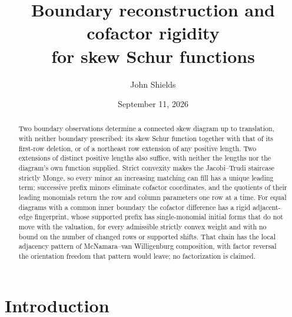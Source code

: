 \documentclass[11pt,a4paper]{amsart}
\title[Boundary reconstruction and cofactor rigidity]
{Boundary reconstruction and cofactor rigidity\\
for skew Schur functions}
\author{John Shields}
\date{September 11, 2026}
\numberwithin{equation}{section}
\theoremstyle{plain}
\theoremstyle{definition}
\begin{document}
\begin{abstract}
Two boundary observations determine a connected skew diagram up to translation, with neither boundary prescribed: its skew Schur function together with that of its first-row deletion, or of a northeast row extension of any positive length.  Two extensions of distinct positive lengths also suffice, with neither the lengths nor the diagram's own function supplied.  Strict convexity makes the Jacobi--Trudi staircase strictly Monge, so every minor an increasing matching can fill has a unique leading term; successive prefix minors eliminate cofactor coordinates, and the quotients of their leading monomials return the row and column parameters one row at a time.  For equal diagrams with a common inner boundary the cofactor difference has a rigid adjacent-edge fingerprint, whose supported prefix has single-monomial initial forms that do not move with the valuation, for every admissible strictly convex weight and with no bound on the number of changed rows or supported shifts.  That chain has the local adjacency pattern of McNamara--van Willigenburg composition, with factor reversal the orientation freedom that pattern would leave; no factorization is claimed.
\end{abstract}

\maketitle

\section{Introduction}
\end{document}
